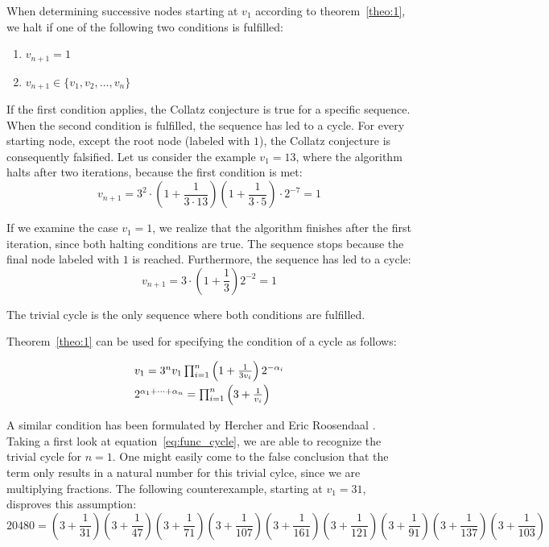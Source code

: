 \begin{definition}
	\label{def:halting_conditions}
	When determining successive nodes starting at $v_1$ according to theorem~\ref{theo:1}, we halt if one of the following two conditions is fulfilled:
	\begin{enumerate}
		\item $v_{n+1}=1$
		\item $v_{n+1}\in\{v_1,v_2,\ldots,v_n\}$
	\end{enumerate}
	If the first condition applies, the Collatz conjecture is true for a specific sequence. When the second condition is fulfilled, the sequence has led to a cycle. For every starting node, except the root node (labeled with $1$), the Collatz conjecture is consequently falsified. Let us consider the example $v_1=13$, where the algorithm halts after two iterations, because the first condition is met:
	\[
	v_{n+1}=3^2\cdot\left(1+\frac{1}{3\cdot13}\right)\left(1+\frac{1}{3\cdot5}\right)\cdot2^{-7}=1
	\]
	
	If we examine the case $v_{1}=1$, we realize that the algorithm finishes after the first iteration, since both halting conditions are true. The sequence stops because the final node labeled with $1$ is reached. Furthermore, the sequence has led to a cycle:
	\[
	v_{n+1}=3\cdot\left(1+\frac{1}{3}\right)2^{-2}=1
	\]
	
	The trivial cycle is the only sequence where both conditions are fulfilled.
\end{definition}

\noindent
Theorem~\ref{theo:1} can be used for specifying the condition of a cycle as follows:

\begin{equation}
\label{eq:func_cycle}
\begin{array}{l}
v_{1}=3^nv_1\prod_{i=1}^{n}\left(1+\frac{1}{3v_i}\right)2^{-\alpha_i}
\\[\medskipamount]
2^{\alpha_1+\cdots+\alpha_n}=\prod_{i=1}^{n}\left(3+\frac{1}{v_i}\right)
\end{array}
\end{equation}

A similar condition has been formulated by Hercher \cite{Ref_Hercher} and Eric Roosendaal \cite{Ref_Roosendaal_2020}. Taking a first look at equation~\ref{eq:func_cycle}, we are able to recognize the trivial cycle for $n=1$. One might easily come to the false conclusion that the term only results in a natural number for this trivial cylce, since we are multiplying fractions. The following counterexample, starting at $v_1=31$, disproves this assumption:
\begin{equation*}
20480=\left(3+\frac{1}{31}\right)\left(3+\frac{1}{47}\right)
\left(3+\frac{1}{71}\right)\left(3+\frac{1}{107}\right)\left(3+\frac{1}{161}\right)\left(3+\frac{1}{121}\right)\left(3+\frac{1}{91}\right)\left(3+\frac{1}{137}\right)\left(3+\frac{1}{103}\right)
\end{equation*}

